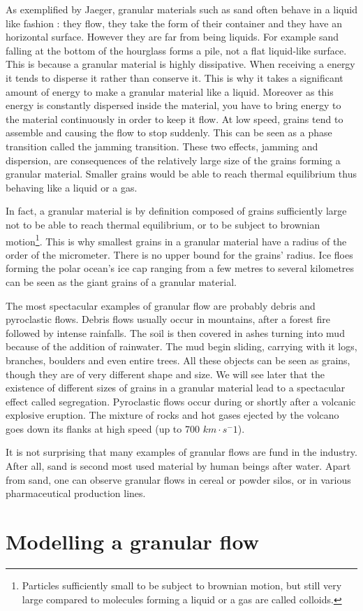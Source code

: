\documentclass[11pt,a4paper]{report}
\begin{document}
As exemplified by Jaeger, granular materials such as sand often behave in a liquid like fashion : they flow, they take the form of their container and they have an horizontal surface. However they are far from being liquids. For example sand falling at the bottom of the hourglass forms a pile, not a flat liquid-like surface.
This is because a granular material is highly dissipative. When receiving a energy it tends to disperse it rather than conserve it. This is why it takes a significant amount of energy to make a granular material like a liquid. Moreover as this energy is constantly dispersed inside the material, you have to bring energy to the material continuously in order to keep it flow. 
At low speed, grains tend to assemble and causing the flow to stop suddenly. This can be seen as a phase transition called the jamming transition.
These two effects, jamming and dispersion, are consequences of the relatively large size of the grains forming a granular material. Smaller grains would be able to reach thermal equilibrium thus behaving like a liquid or a gas.

In fact, a granular material is by definition composed of grains sufficiently large not to be able to reach thermal equilibrium, or to be subject to brownian motion\footnote{Particles sufficiently small to be subject to brownian motion, but still very large compared to molecules forming a liquid or a gas are called colloids.}.
This is why smallest grains in a granular material have a radius of the order of the micrometer.
There is no upper bound for the grains' radius. Ice floes forming the polar ocean's ice cap ranging from a few metres to several kilometres can be seen as the giant grains of a granular material.

The most spectacular examples of granular flow are probably debris and pyroclastic flows.
Debris flows usually occur in mountains, after a forest fire followed by intense rainfalls. The soil is then covered in ashes turning into mud because of the addition of rainwater. The mud begin sliding, carrying with it logs, branches, boulders and even entire trees. All these objects can be seen as grains, though they are of very different shape and size. We will see later that the existence of different sizes of grains in a granular material lead to a spectacular effect called segregation.
Pyroclastic flows occur during or shortly after a volcanic explosive eruption. The mixture of rocks and hot gases ejected by the volcano goes down its flanks at high speed (up to 700 $km \cdot s^-1$).

It is not surprising that many examples of granular flows are fund in the industry. After all, sand is second most used material by human beings after water. 
Apart from sand, one can observe granular flows in cereal or powder silos, or in various pharmaceutical production lines.

\section{Modelling a granular flow}
\end{document}

